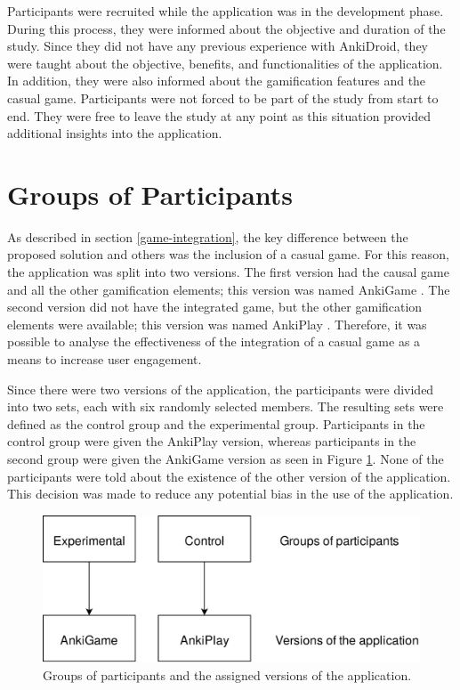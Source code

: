 Participants were recruited while the application was in the development phase. During this process, they were informed about the objective and duration of the study. Since they did not have any previous experience with AnkiDroid, they were taught about the objective, benefits, and functionalities of the application. In addition, they were also informed about the gamification features and the casual game. Participants were not forced to be part of the study from start to end. They were free to leave the study at any point as this situation provided additional insights into the application.

\section{Groups of Participants}
As described in section \ref{game-integration}, the key difference between the proposed solution and others was the inclusion of a casual game. For this reason, the application was split into two versions. The first version had the causal game and all the other gamification elements; this version was named AnkiGame \citep{velasquez2018ankigame}. The second version did not have the integrated game, but the other gamification elements were available; this version was named AnkiPlay \citep{velasquez2018ankiplay}. Therefore, it was possible to analyse the effectiveness of the integration of a casual game as a means to increase user engagement.

Since there were two versions of the application, the participants were divided into two sets, each with six randomly selected members. The resulting sets were defined as the control group and the experimental group. Participants in the control group were given the AnkiPlay version, whereas participants in the second group were given the AnkiGame version as seen in Figure \ref{fig:participants-version}. None of the participants were told about the existence of the other version of the application. This decision was made to reduce any potential bias in the use of the application.

\begin{figure}[htb]
    \vskip 5mm
        \begin{center}
            \includegraphics[scale=0.25]{./Figures/participants_version.png}
            \caption{Groups of participants and the assigned versions of the application.}
            \label{fig:participants-version}
        \end{center}
    \vskip -5mm
\end{figure}

